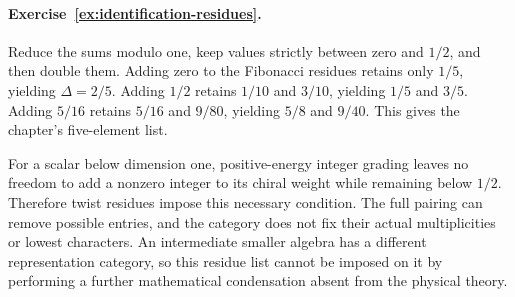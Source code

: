 \paragraph{Exercise~\ref{ex:identification-residues}.}
\label{sol:ex:identification-residues}
Reduce the sums modulo one, keep values strictly between zero
and $1/2$, and then double them. Adding zero to the Fibonacci
residues retains only $1/5$, yielding $\Delta=2/5$. Adding
$1/2$ retains $1/10$ and $3/10$, yielding $1/5$ and $3/5$.
Adding $5/16$ retains $5/16$ and $9/80$, yielding $5/8$ and
$9/40$. This gives the chapter's five-element list.

For a scalar below dimension one, positive-energy integer
grading leaves no freedom to add a nonzero integer to its
chiral weight while remaining below $1/2$. Therefore twist
residues impose this necessary condition. The full pairing
can remove possible entries, and the category does not fix
their actual multiplicities or lowest characters. An
intermediate smaller algebra has a different representation
category, so this residue list cannot be imposed on it by
performing a further mathematical condensation absent from
the physical theory.

